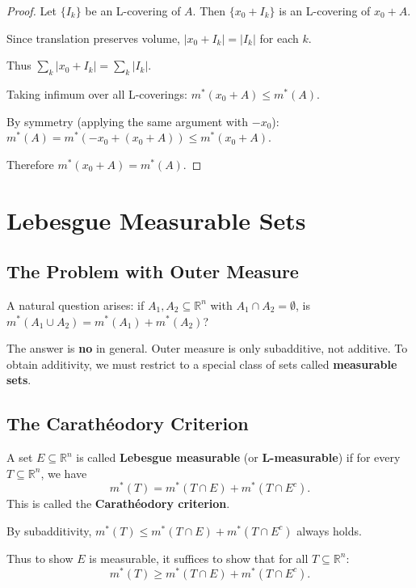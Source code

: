 \documentclass[11pt]{report}
\begin{document}
\begin{proof}
Let $\{I_k\}$ be an L-covering of $A$. Then $\{x_0 + I_k\}$ is an L-covering of $x_0 + A$.

Since translation preserves volume, $|x_0 + I_k| = |I_k|$ for each $k$.

Thus $\sum_k |x_0 + I_k| = \sum_k |I_k|$.

Taking infimum over all L-coverings: $m^*(x_0 + A) \leq m^*(A)$.

By symmetry (applying the same argument with $-x_0$): $m^*(A) = m^*(-x_0 + (x_0 + A)) \leq m^*(x_0 + A)$.

Therefore $m^*(x_0 + A) = m^*(A)$.
\end{proof}

\section{Lebesgue Measurable Sets}

\subsection{The Problem with Outer Measure}

A natural question arises: if $A_1, A_2 \subseteq \mathbb{R}^n$ with $A_1 \cap A_2 = \emptyset$, is $m^*(A_1 \cup A_2) = m^*(A_1) + m^*(A_2)$?

The answer is \textbf{no} in general. Outer measure is only subadditive, not additive. To obtain additivity, we must restrict to a special class of sets called \textbf{measurable sets}.

\subsection{The Carathéodory Criterion}

\begin{defbox}
A set $E \subseteq \mathbb{R}^n$ is called \textbf{Lebesgue measurable} (or \textbf{L-measurable}) if for every $T \subseteq \mathbb{R}^n$, we have
\[
m^*(T) = m^*(T \cap E) + m^*(T \cap E^c).
\]
This is called the \textbf{Carathéodory criterion}.
\end{defbox}

\begin{rembox}
By subadditivity, $m^*(T) \leq m^*(T \cap E) + m^*(T \cap E^c)$ always holds.

Thus to show $E$ is measurable, it suffices to show that for all $T \subseteq \mathbb{R}^n$:
\[
m^*(T) \geq m^*(T \cap E) + m^*(T \cap E^c).
\]
\end{rembox}
\end{document}
